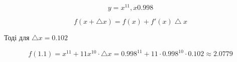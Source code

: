 {}

$$
  y=x^{11}, x 0.998
$$

$$
f(x+\bigtriangleup{x}) = f(x) + f'(x)\bigtriangleup{x}
$$

Тоді для $\bigtriangleup{x} = 0.102$

$$
  f(1.1) = x^{11} + 11x^{10} \cdot \bigtriangleup{x} = 0.998^{11}+11\cdot{0.998}^{10} \cdot 0.102 \approx 2.0779 
$$
